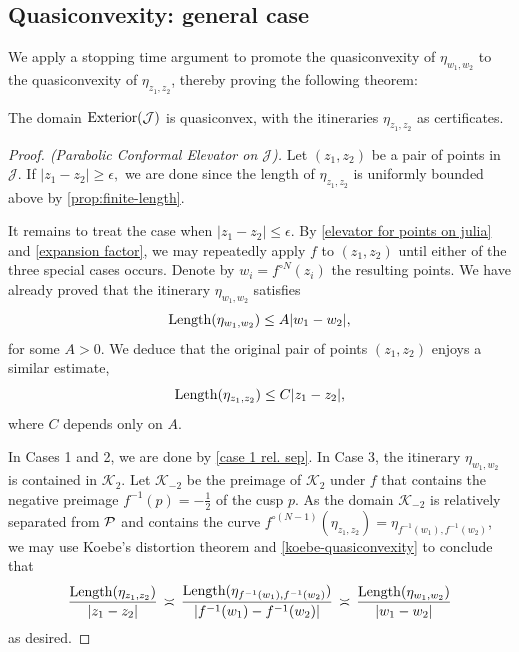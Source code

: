\subsection{Quasiconvexity: general case}
We apply a stopping time argument to promote the quasiconvexity of $\eta_{w_1,w_2}$ to the quasiconvexity of $\eta_{z_1,z_2}$, thereby proving the following theorem:

\begin{theorem} \label{quasiconvex-Cauliflower}
	The domain $\operatorname{Exterior}(\mathcal{J})$ is quasiconvex, with the itineraries $\eta_{z_1,z_2}$ as certificates.
\end{theorem}

\begin{proof}[Proof. (Parabolic Conformal Elevator on $\mathcal J$)] \label{parabolic-elevator}
Let  $(z_1,z_2)$ be a pair of points in $\mathcal J$. 
If $|z_{1}-z_{2}| \geq \epsilon,$ 
we are done since the length of $\eta_{z_1,z_2}$ is uniformly bounded above by  \cref{prop:finite-length}.

It remains to treat the case when $|z_{1}-z_{2}| \le \epsilon$. By  \cref{elevator for points on julia} and \cref{expansion factor}, we may repeatedly apply $f$ to $(z_1, z_2)$ until either of the three special cases occurs.
Denote by $w_i=f^{\circ N}(z_i)$ the resulting points. We have already proved that the itinerary $\eta_{w_1,w_2}$ satisfies
\begin{equation*}
	\operatorname{Length}(\eta_{w_1,w_2}) \leq A |w_1-w_2|,
\end{equation*}
for some $A>0$. We deduce that the original pair of points $(z_1,z_2)$ enjoys a similar estimate,
\begin{equation*}
	\operatorname{Length}(\eta_{z_1,z_2}) \leq C |z_1-z_2|,
\end{equation*}
where $C$ depends only on $A$.

In Cases 1 and 2, we are done by \cref{case 1 rel. sep}. In Case 3, 
the itinerary $\eta_{w_1,w_2}$ is contained in $\mathcal K_2$. Let $\mathcal K_{-2}$ be the preimage of $\mathcal K_2$ under $f$ that contains the negative preimage $f^{-1}(p)=-\tfrac 12$ of the cusp $p$. 
As the domain $\mathcal K_{-2}$ is relatively separated from $\operatorname{\mathcal P}$ and contains the curve 
$f^{\circ (N-1)}(\eta_{z_1,z_2}) = \eta_{f^{-1}(w_1),f^{-1}(w_2)}$,
we may use Koebe's distortion theorem and \cref{koebe-quasiconvexity} to conclude that
\begin{equation}
	\frac{\operatorname{Length}(\eta_{z_1,z_2})}{|z_1-z_2|} \, \asymp \,
		\frac{\operatorname{Length}(\eta_{f^{-1}(w_1),f^{-1}(w_2)})}{|f^{-1}(w_1)-f^{-1}(w_2)|} \, \asymp \,
		\frac{\operatorname{Length}(\eta_{w_1,w_2})}{|w_1-w_2|}
\end{equation}
as desired.
\end{proof}



\printnomenclature

